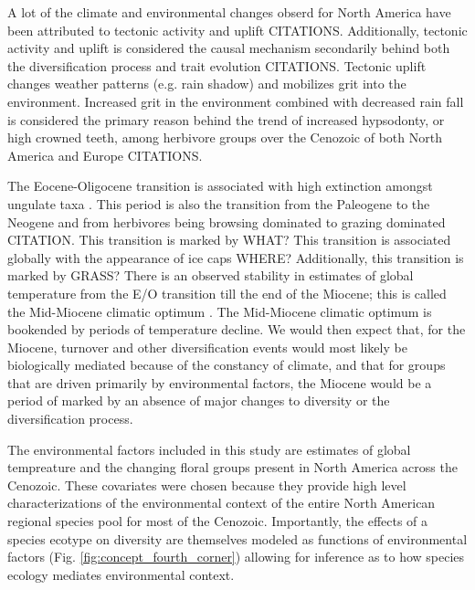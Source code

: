 \documentclass[12pt,letterpaper]{article}
\begin{document}
A lot of the climate and environmental changes obserd for North America have been attributed to tectonic activity and uplift \citep{Blois2009,Eronen2015,Janis2008a,Badgley2013} CITATIONS. Additionally, tectonic activity and uplift is considered the causal mechanism secondarily behind both the diversification process and trait evolution \citep{Blois2009,Badgley2013} CITATIONS. Tectonic uplift changes weather patterns (e.g. rain shadow) and mobilizes grit into the environment. Increased grit in the environment combined with decreased rain fall is considered the primary reason behind the trend of increased hypsodonty, or high crowned teeth, among herbivore groups over the Cenozoic of both North America and Europe CITATIONS.

The Eocene-Oligocene transition is associated with high extinction amongst ungulate taxa \citep{Janis2008a}. This period is also the transition from the Paleogene to the Neogene and from herbivores being browsing dominated to grazing dominated CITATION. This transition is marked by WHAT? This transition is associated globally with the appearance of ice caps WHERE? Additionally, this transition is marked by GRASS? There is an observed stability in estimates of global temperature from the E/O transition till the end of the Miocene; this is called the Mid-Miocene climatic optimum \citep{Zachos2001,Zachos2008}. The Mid-Miocene climatic optimum is bookended by periods of temperature decline. We would then expect that, for the Miocene, turnover and other diversification events would most likely be biologically mediated because of the constancy of climate, and that for groups that are driven primarily by environmental factors, the Miocene would be a period of marked by an absence of major changes to diversity or the diversification process.

The environmental factors included in this study are estimates of global tempreature and the changing floral groups present in North America across the Cenozoic. These covariates were chosen because they provide high level characterizations of the environmental context of the entire North American regional species pool for most of the Cenozoic. Importantly, the effects of a species ecotype on diversity are themselves modeled as functions of environmental factors (Fig. \ref{fig:concept_fourth_corner}) allowing for inference as to how species ecology mediates environmental context. 
\end{document}
